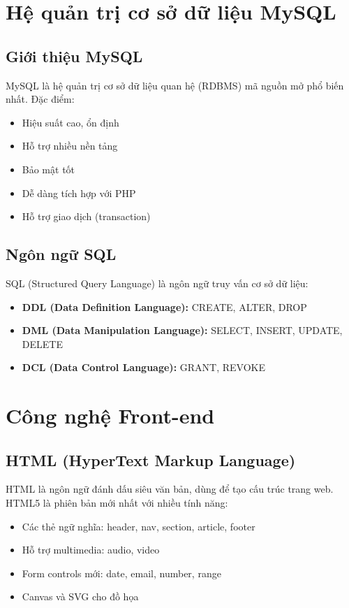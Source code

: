 \documentclass[a4paper,13pt]{extreport}
\begin{document}
\section{Hệ quản trị cơ sở dữ liệu MySQL}

\subsection{Giới thiệu MySQL}
MySQL là hệ quản trị cơ sở dữ liệu quan hệ (RDBMS) mã nguồn mở phổ biến nhất. Đặc điểm:
\begin{itemize}
    \item Hiệu suất cao, ổn định
    \item Hỗ trợ nhiều nền tảng
    \item Bảo mật tốt
    \item Dễ dàng tích hợp với PHP
    \item Hỗ trợ giao dịch (transaction)
\end{itemize}

\subsection{Ngôn ngữ SQL}
SQL (Structured Query Language) là ngôn ngữ truy vấn cơ sở dữ liệu:
\begin{itemize}
    \item \textbf{DDL (Data Definition Language):} CREATE, ALTER, DROP
    \item \textbf{DML (Data Manipulation Language):} SELECT, INSERT, UPDATE, DELETE
    \item \textbf{DCL (Data Control Language):} GRANT, REVOKE
\end{itemize}

\section{Công nghệ Front-end}

\subsection{HTML (HyperText Markup Language)}
HTML là ngôn ngữ đánh dấu siêu văn bản, dùng để tạo cấu trúc trang web. HTML5 là phiên bản mới nhất với nhiều tính năng:
\begin{itemize}
    \item Các thẻ ngữ nghĩa: header, nav, section, article, footer
    \item Hỗ trợ multimedia: audio, video
    \item Form controls mới: date, email, number, range
    \item Canvas và SVG cho đồ họa
\end{itemize}
\end{document}
